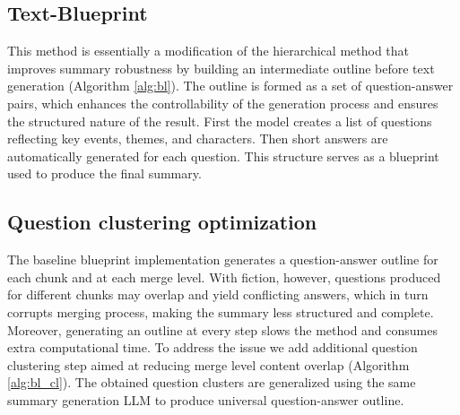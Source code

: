 \documentclass{superfri}
\begin{document}
\subsection{Text-Blueprint}
This method \cite{blueprint} is essentially a modification of the hierarchical method 
that improves summary robustness by building an intermediate outline before text generation  (Algorithm \ref{alg:bl}).
The outline is formed as a set of question-answer pairs, which enhances the controllability of the generation process and ensures the structured nature of the result.
First the model creates a list of questions reflecting key events, themes, and characters. Then short answers are automatically generated for each question.
This structure serves as a blueprint used to produce the final summary.


\subsection{Question clustering optimization}
The baseline blueprint implementation generates a question-answer outline for each chunk and at each merge level. 
With fiction, however, questions produced for different chunks may overlap and yield conflicting answers, which in turn corrupts merging process, 
making the summary less structured and complete. 
Moreover, generating an outline at every step slows the method and consumes extra computational time.
To address the issue we add additional question clustering step aimed at reducing merge level content overlap  (Algorithm \ref{alg:bl_cl}). 
The obtained question clusters are generalized using the same summary generation LLM to produce universal question-answer outline.
\end{document}
